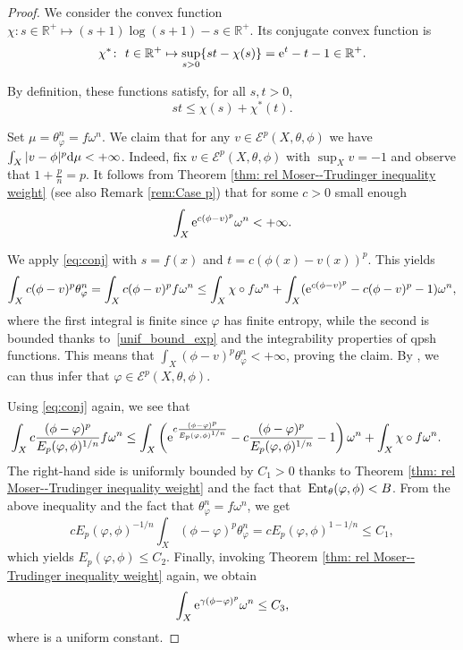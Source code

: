 \documentclass[pdftex]{sigma}
\numberwithin{equation}{section}
\theoremstyle{plain}
\newcommand{\R}{\mathbb R}
\newcommand{\f}{\varphi}
\newcommand \Ent{{\rm Ent}}
\begin{document}
\begin{proof}
 We consider the convex function $\chi\colon s \in \R^+ \mapsto (s+1) \log (s+1) -s \in \R^+$. Its conjugate convex function is
\[
\chi^*\colon\ t \in \R^+ \mapsto \sup_{s>0} \{ st-\chi(s) \}={\rm e}^t-t-1 \in \R^+.
\]

By definition, these functions satisfy, for all $s,t>0$,
\begin{equation} \label{eq:conj}
st \leq \chi(s)+\chi^*(t).
\end{equation}

Set $\mu=\theta_\varphi^n = f \omega^n$.	We claim that for any $v\in \mathcal{E}^p(X,\theta, \phi)$ we have $\int_X |v-\phi|^p {\rm d}\mu <+\infty$. Indeed, fix $v \in \mathcal{E}^p(X,\theta, \phi)$ with $\sup_X v=-1$ and observe that $1+\frac{p}{n} = p$. It follows from Theorem \ref{thm: rel Moser--Trudinger inequality weight} (see also Remark \ref{rem:Case p}) that for some $c>0$ small enough
\begin{equation}\label{unif_bound_exp}
\int_X {\rm e}^{c (\phi-v)^p} \omega^n <+\infty.
\end{equation}

We apply \eqref{eq:conj} with $s=f(x)$ and $t=c(\phi(x)-v(x))^p$. This yields
\[
\int_X c(\phi-v)^p \theta_\f^n= \int_X c (\phi-v)^p f \omega^n \leq \int_X \chi\circ f \omega^n +\int_X ({\rm e}^{c (\phi-v)^p}-c (\phi-v)^p-1) \omega^n,
\]
where the first integral is finite since $\varphi$ has finite entropy, while the second is bounded thanks to~\eqref{unif_bound_exp} and the integrability properties of qpsh functions.
This means that $\int_X (\phi-v)^p \theta_\f^n<+\infty$, proving the claim. By \cite[Theorem~1.4]{DDL6}, we can thus infer that $\f\in \mathcal{E}^p(X,\theta, \phi)$.

Using \eqref{eq:conj} again, we see that
 \begin{align*}
 	 \int_X c \frac{(\phi-\f)^{p}}{ E_p(\f, \phi)^{1/n}} f \omega^n
 	 & \leq \int_X \left({\rm e}^{c \frac{(\phi-\f)^{p}}{ E_p(\f, \phi)^{1/n}}} -c \frac{(\phi-\f)^{p}}{ E_p(\f, \phi)^{1/n}}-1 \right)\omega^n
 	 + \int_X \chi\circ f \omega^n.
 \end{align*}
 The right-hand side is uniformly bounded by $C_1>0$ thanks to Theorem \ref{thm: rel Moser--Trudinger inequality weight} and the fact that~${\Ent_\theta(\varphi, \phi)< B}$. From the above inequality and the fact that $\theta_\varphi^n= f\omega^n$, we get \[c { E_p(\f, \phi)^{-1/n}} \int_X {(\phi-\f)^{p}} \theta_\varphi^n = c E_p(\f, \phi )^{1-1/n} \leq C_1,\]
 which yields $E_p(\f, \phi) \leq C_2$.
Finally, invoking Theorem \ref{thm: rel Moser--Trudinger inequality weight} again, we obtain{\samepage
\[
\int_X {\rm e}^{\gamma (\phi-\f)^p} \omega^n \leq C_3,
\]
 where  is a uniform constant.}


\end{proof}
\end{document}

